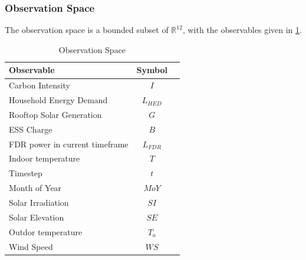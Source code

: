 \subsubsection{Observation Space}
The observation space is a bounded subset of $\mathbb{R}^{12}$, with the observables given in \ref{tab:observation_space}. 

\begin{table}[H]
\label{tab:observation_space}
\caption{Observation Space}
\vskip 0.15in
\begin{center}
\begin{small}
\begin{sc}
\begin{tabular}{lcr}
\toprule
Observable & Symbol \\
\midrule
Carbon Intensity & $I$\\
    Household Energy Demand & $L_{HED}$ \\
    Rooftop Solar Generation & $G$ \\
    ESS Charge & $B$ \\
    FDR power in current timeframe & $L_{FDR}$ \\
    Indoor temperature & $T$ \\
    Timestep & $t$ \\
    Month of Year & $MoY$ \\
    Solar Irradiation & $SI$ \\
    Solar Elevation & $SE$ \\
    Outdor temperature & $T_a$ \\
    Wind Speed & $WS$ \\
\bottomrule
\end{tabular}
\end{sc}
\end{small}
\end{center}
\vskip -0.1in
\end{table}

